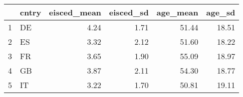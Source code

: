 \begin{table}[ht]
\centering
\begin{tabular}{rlrrrr}
  \hline
 & cntry & eisced\_mean & eisced\_sd & age\_mean & age\_sd \\ 
  \hline
1 & DE & 4.24 & 1.71 & 51.44 & 18.51 \\ 
  2 & ES & 3.32 & 2.12 & 51.60 & 18.22 \\ 
  3 & FR & 3.65 & 1.90 & 55.09 & 18.97 \\ 
  4 & GB & 3.87 & 2.11 & 54.30 & 18.77 \\ 
  5 & IT & 3.22 & 1.70 & 50.81 & 19.11 \\ 
   \hline
\end{tabular}
\end{table}
